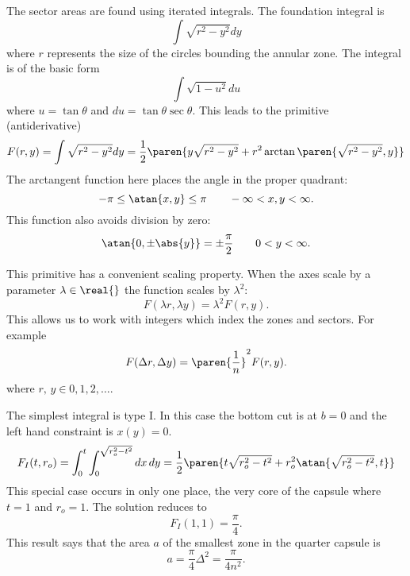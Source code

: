 The sector areas are found using iterated integrals. The foundation integral is
\begin{equation*}
  \int \sqrt{ r^{2} - y^{2} } dy
\end{equation*}
where $r$ represents the size of the circles bounding the annular zone. The integral is of the basic form
\begin{equation*}
  \int \sqrt{ 1 - u^{2} } du
\end{equation*}
where $u=\tan \theta$ and $du=\tan \theta \sec \theta$. This leads to the primitive (antiderivative)
%
\begin{equation}
  F(r, y) = \int \sqrt{ r^{2} - y^{2} } dy 
          = \frac{1}{2} \paren{ y \sqrt{ r^{2} - y^{2} } + r^{2} \arctan \paren{ \sqrt{ r^{2} - y^{2} }, y }}
\end{equation}
%
The arctangent function here places the angle in the proper quadrant:
%
\begin{equation}
  -\pi \le \atan {x,y} \le \pi \qquad -\infty < x, y < \infty.
\end{equation}
%
This function also avoids division by zero:
%
\begin{equation}
  \atan {0,\pm \abs{y}} = \pm \frac{\pi}{2} \qquad 0 < y < \infty.
  \label{eq:singular}
\end{equation}

This primitive has a convenient scaling property. When the axes scale by a parameter $\lambda \in \real{}$ the function scales by $\lambda^{2}$:
\begin{equation}
  F(\lambda r, \lambda y) = \lambda^{2} F(r, y).
\end{equation}
This allows us to work with integers which index the zones and sectors. For example
\begin{equation}
  F(\Delta r, \Delta y) = \paren{ \frac{1}{n} }^{2} F(r, y).
\end{equation}
where $r,\, y \in 0, 1, 2, \dots$. 

The simplest integral is type I. In this case the bottom cut is at $b = 0$ and the left hand constraint is $x(y) = 0$.
\begin{equation}
  F_{I} (t, r_{o}) = \int_{0}^{t} \int_{0}^{\sqrt{r_{o}^{2} - t^{2}}} dx\,dy = \frac{1}{2} \paren{ t\sqrt{r_{o}^{2} - t^{2}} + r_{o}^{2} \atan{\sqrt{r_{o}^{2} - t^{2}}, t} }
\end{equation}
This special case occurs in only one place, the very core of the capsule where $t=1$ and $r_{o} = 1$. The solution reduces to
\begin{equation}
  F_{I} (1, 1) = \frac{\pi}{4}.
\end{equation}
This result says that the area $a$ of the smallest zone in the quarter capsule is 
\begin{equation}
  a = \frac{\pi}{4} \Delta^{2} = \frac{\pi}{4n^{2}}.
\end{equation}

